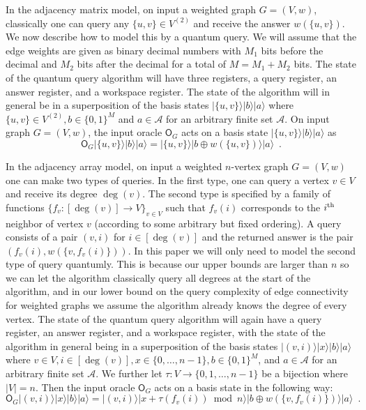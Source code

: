 \documentclass[10pt,a4paper]{article}
\newcommand{\Acal}{\mathcal{A}}
\newcommand{\ith}{i^{\scriptsize \mbox{{\rm th}}}}
\newcommand{\1}{\mathbf{1}}
\theoremstyle{definition}
\begin{document}
In the adjacency matrix model, on input a weighted graph $G = (V,w)$, classically one can query any $\{u,v\} \in V^{(2)}$ and receive the answer 
$w(\{u,v\})$.  We now describe how to model this by a quantum query.  We will assume that the 
edge weights are given as binary decimal numbers with $M_1$ bits before the decimal and $M_2$ bits after the decimal for a total of $M = M_1 + M_2$ bits.  
The state of the quantum query 
algorithm will have three registers, a query register, an answer register, and a workspace register.  The 
state of the algorithm will in general be in a superposition of the basis states $|\{u,v\} \rangle |b \rangle | a \rangle$ where $\{u,v\} \in V^{(2)}, b \in \{0,1\}^M$ 
and $a \in \Acal$ for an arbitrary finite set $\Acal$.  
On input graph $G = (V,w)$, the input oracle $\mathsf{O}_G$ acts on a basis state $|\{u,v\} \rangle |b \rangle | a \rangle$ as
\[
\mathsf{O}_G |\{u,v\} \rangle |b \rangle | a \rangle = |\{u,v\} \rangle |b \oplus w(\{u,v\}) \rangle | a \rangle \enspace.
\]
 
In the adjacency array model, on input a weighted $n$-vertex graph $G = (V,w)$ one can make two types of queries.  In the first type, one can query a vertex $v \in V$ and receive its degree $\deg(v)$.
The second type is specified by a family of functions $\{f_v : [\deg(v)] \rightarrow V\}_{v \in V}$ such that $f_v(i)$ corresponds to the $\ith$ neighbor of vertex $v$ (according to some arbitrary but fixed ordering).  
A query consists of a pair $(v,i)$ for $i \in [\deg(v)]$ and the returned answer is the pair
$(f_v(i), w(\{v,f_v(i)\}))$.  In this paper we will only 
need to model the second type of query quantumly.  This is because our upper bounds are larger than $n$ so we can let the algorithm classically 
query all degrees at the start of the algorithm, and in our lower bound on the query complexity of edge connectivity for weighted graphs we assume the 
algorithm already knows the degree of every vertex.  
The state of the quantum query algorithm will again have a query register, an answer register, and a workspace register, with the state of the algorithm 
in general being in a superposition of the basis states $|(v,i)\rangle |x \rangle |b \rangle | a \rangle$ where $v \in V, i \in [\deg(v)], x \in \{0,\ldots, n-1\}, b \in \{0,1\}^M$, 
and $a \in \Acal$ for an arbitrary finite set $\Acal$.  We further let $\tau : V \rightarrow \{0,1,\ldots, n-1\}$ be a bijection where $|V| = n$.  Then the input oracle $\mathsf{O}_G$ acts on a basis state in the following way:
\[
\mathsf{O}_G |(v,i)\rangle |x \rangle |b \rangle | a \rangle = |(v,i) \rangle |x + \tau(f_v(i)) \bmod n \rangle |b \oplus w(\{v,f_v(i)\}) \rangle | a \rangle \enspace.
\]
\end{document}
